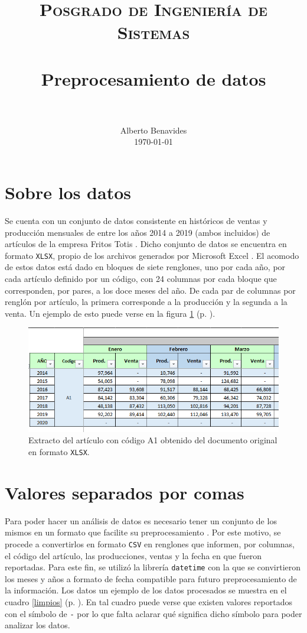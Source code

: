 \documentclass[paper=leter, fontsize=11pt]{scrartcl}
\title{
		\usefont{OT1}{bch}{b}{n}
		\normalfont \normalsize \textsc{Posgrado de Ingeniería de Sistemas} \\ [25pt]
		\horrule{0.5pt} \\[0.4cm]
		\huge Preprocesamiento de datos \\
		\horrule{2pt} \\[0.5cm]
}
\author{
		\normalfont 								\normalsize
        Alberto Benavides\\[-3pt]		\normalsize
        \today
}
\date{}
\numberwithin{equation}{section}		%
\numberwithin{figure}{section}			%
\numberwithin{table}{section}				%
\begin{document}
\maketitle
\section{Sobre los datos}

Se cuenta con un conjunto de datos consistente en históricos de ventas y producción mensuales de entre los años 2014 a 2019 (ambos incluidos) de artículos de la empresa Fritos Totis \cite{totis}. Dicho conjunto de datos se encuentra en formato \texttt{{XLSX}}, propio de los archivos generados por Microsoft Excel \cite{excel}. El acomodo de estos datos está dado en bloques de siete renglones, uno por cada año, por cada artículo definido por un código, con 24 columnas por cada bloque que corresponden, por pares, a los doce meses del año. De cada par de columnas por renglón por artículo, la primera corresponde a la producción y la segunda a la venta. Un ejemplo de esto puede verse en la figura \ref{ejemploExcel} (p. \pageref{ejemploExcel}).

\begin{figure}[t]
    \includegraphics[width=\textwidth]{ejemploExcel}
    \centering
    \caption{Extracto del artículo con código A1 obtenido del documento original en formato \texttt{XLSX}.}
    \label{ejemploExcel}
\end{figure}

\section{Valores separados por comas}

Para poder hacer un análisis de datos es necesario tener un conjunto de los mismos en un formato que facilite su preprocesamiento \cite{preparacion}. Por este motivo, se procede a convertirlos en formato \texttt{CSV} \cite{csv} en renglones que informen, por columnas, el código del artículo, las producciones, ventas y la fecha en que fueron reportadas. Para este fin, se utilizó la librería \texttt{datetime} \cite{datetime} con la que se convirtieron los meses y años a formato de fecha compatible para futuro preprocesamiento de la información. Los datos un ejemplo de los datos procesados se muestra en el cuadro \ref{limpios} (p. \pageref{limpios}). En tal cuadro puede verse que existen valores reportados con el símbolo de \texttt{-} por lo que falta aclarar qué significa dicho símbolo para poder analizar los datos.
\end{document}
